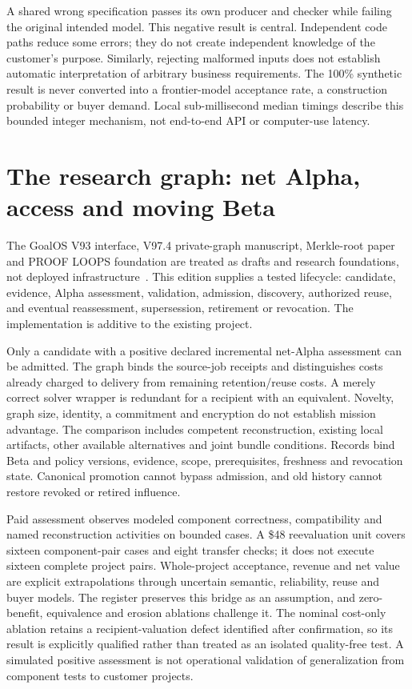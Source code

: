 \documentclass[11pt,letterpaper]{article}
\newcommand{\usd}[1]{\$#1}
\begin{document}
A shared wrong specification passes its own producer and checker while failing the original intended model. This negative result is central. Independent code paths reduce some errors; they do not create independent knowledge of the customer's purpose. Similarly, rejecting malformed inputs does not establish automatic interpretation of arbitrary business requirements. The 100\% synthetic result is never converted into a frontier-model acceptance rate, a construction probability or buyer demand. Local sub-millisecond median timings describe this bounded integer mechanism, not end-to-end API or computer-use latency.

\section{The research graph: net Alpha, access and moving Beta}
The GoalOS V93 interface, V97.4 private-graph manuscript, Merkle-root paper and PROOF LOOPS foundation are treated as drafts and research foundations, not deployed infrastructure~\cite{V93,V974,Merkle,Proof}. This edition supplies a tested lifecycle: candidate, evidence, Alpha assessment, validation, admission, discovery, authorized reuse, and eventual reassessment, supersession, retirement or revocation. The implementation is additive to the existing project.

Only a candidate with a positive declared incremental net-Alpha assessment can be admitted. The graph binds the source-job receipts and distinguishes costs already charged to delivery from remaining retention/reuse costs. A merely correct solver wrapper is redundant for a recipient with an equivalent. Novelty, graph size, identity, a commitment and encryption do not establish mission advantage. The comparison includes competent reconstruction, existing local artifacts, other available alternatives and joint bundle conditions. Records bind Beta and policy versions, evidence, scope, prerequisites, freshness and revocation state. Canonical promotion cannot bypass admission, and old history cannot restore revoked or retired influence.

Paid assessment observes modeled component correctness, compatibility and named reconstruction activities on bounded cases. A \usd{48} reevaluation unit covers sixteen component-pair cases and eight transfer checks; it does not execute sixteen complete project pairs. Whole-project acceptance, revenue and net value are explicit extrapolations through uncertain semantic, reliability, reuse and buyer models. The register preserves this bridge as an assumption, and zero-benefit, equivalence and erosion ablations challenge it. The nominal cost-only ablation retains a recipient-valuation defect identified after confirmation, so its result is explicitly qualified rather than treated as an isolated quality-free test. A simulated positive assessment is not operational validation of generalization from component tests to customer projects.
\end{document}
